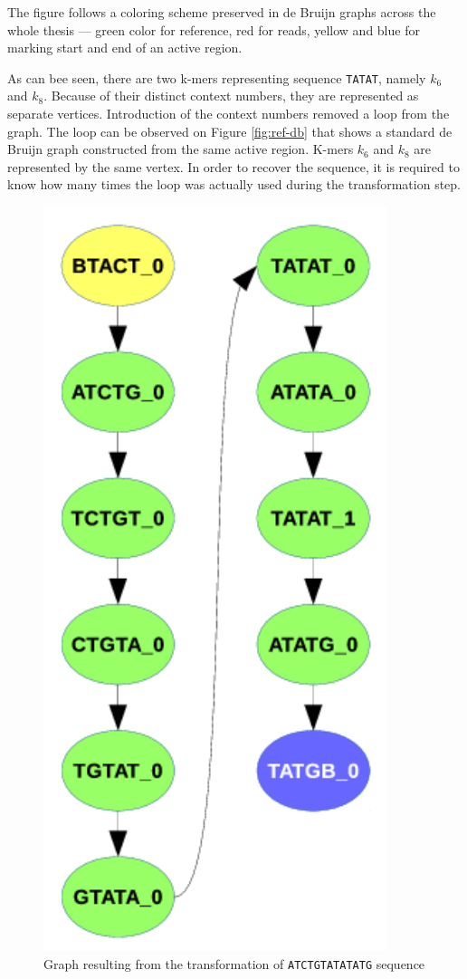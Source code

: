 The figure follows a coloring scheme preserved in de Bruijn graphs across the whole thesis --- green color for reference, red for reads, yellow and blue for marking start and end of an active region.

As can bee seen, there are two k-mers representing sequence \texttt{TATAT}, namely $k_6$ and $k_8$. Because of their distinct context numbers, they are represented as separate vertices. Introduction of the context numbers removed a loop from the graph. The loop can be observed on Figure \ref{fig:ref-db} that shows a standard de Bruijn graph constructed from the same active region. K-mers $k_6$ and $k_8$ are represented by the same vertex. In order to recover the sequence, it is required to know how many times the loop was actually used during the transformation step.

\begin{figure}[h]
	\centering
	\includegraphics{img/ref-my.pdf}
	\caption{Graph resulting from the transformation of \texttt{ATCTGTATATATG} sequence}
	\label{fig:ref-my}
\end{figure}


